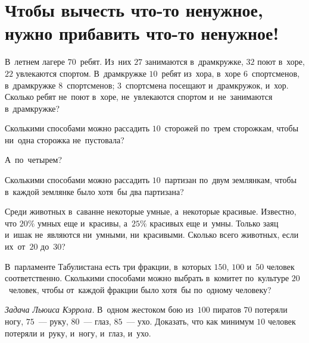 
\section*{Чтобы вычесть что-то ненужное, нужно прибавить что-то ненужное!}


\begin{problems}

\item
В~летнем лагере $70$~ребят.
Из~них $27$ занимаются в~драмкружке, $32$ поют в~хоре, $22$ увлекаются спортом.
В~драмкружке $10$~ребят из~хора, в~хоре $6$~спортсменов, в~драмкружке
$8$~спортсменов;
$3$~спортсмена посещают и~драмкружок, и~хор.
Сколько ребят не~поют в~хоре, не~увлекаются спортом и~не~занимаются
в~драмкружке?

\item
Сколькими способами можно рассадить $10$~сторожей по~трем сторожкам, чтобы
ни~одна сторожка не~пустовала?

\item
А~по~четырем?

\item
Сколькими способами можно рассадить $10$~партизан по~двум землянкам, чтобы
в~каждой землянке было хотя~бы два партизана?

\item
Среди животных в~саванне некоторые умные, а~некоторые красивые.
Известно, что $20\%$ умных еще и~красивы, а~$25\%$ красивых еще и~умны.
Только заяц и~ишак не~являются ни~умными, ни~красивыми.
Сколько всего животных, если их~от~$20$ до~$30$?

\item
В~парламенте Табулистана есть три фракции, в~которых $150$, $100$ и~$50$
человек соответственно.
Сколькими способами можно выбрать в~комитет по~культуре $20$~человек, чтобы
от~каждой фракции было хотя~бы по~одному человеку?

\item\emph{Задача Льюиса Кэррола.}
В~одном жестоком бою из~$100$ пиратов $70$ потеряли ногу, $75$~--- руку,
$80$~--- глаз, $85$~--- ухо.
Доказать, что как минимум $10$ человек потеряли и~руку, и~ногу, и~глаз, и~ухо.

\end{problems}

